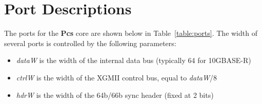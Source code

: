 \section{Port Descriptions}

The ports for the \textbf{Pcs} core are shown below in Table~\ref{table:ports}. The width of several ports is controlled by the following parameters:

\begin{itemize}[noitemsep]
  \item \textit{dataW} is the width of the internal data bus (typically 64 for 10GBASE-R)
  \item \textit{ctrlW} is the width of the XGMII control bus, equal to \textit{dataW}/8
  \item \textit{hdrW} is the width of the 64b/66b sync header (fixed at 2 bits)
\end{itemize}


